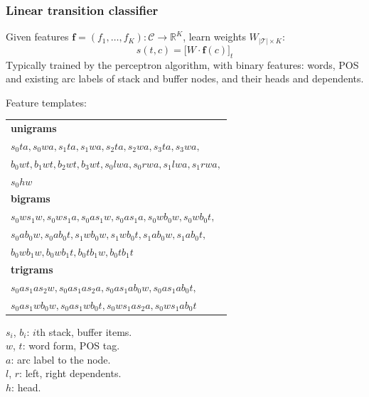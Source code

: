 \documentclass[t]{beamer}
\begin{document}
\begin{frame}
    \frametitle{Linear transition classifier \cite{Nivre03anefficient}}
    Given features $\mathbf{f}=(f_1, \ldots, f_K) : \mathcal{C}\to\mathbb{R}^K$, learn weights $W_{|\mathcal{T}|\times K}$:
    \[
    s(t,c)=\big[W\cdot\mathbf{f}(c)\big]_t
    \]
    Typically trained by the perceptron algorithm, with binary features:
	words, POS and existing arc labels of stack and buffer nodes, and
	their heads and dependents.
    
    \pause\vfill
    
    Feature templates:
    
    \begin{minipage}{.5\textwidth}
	\begin{adjustbox}{margin=3pt,frame,scale=.6}
	\begin{tabular}{l}
	\textbf{unigrams} \\
	$s_0ta, s_0wa, s_1ta, s_1wa, s_2ta, s_2wa, s_3ta, s_3wa,$ \\
	$b_0wt, b_1wt, b_2wt, b_3wt,s_0lwa, s_0rwa, s_1lwa, s_1rwa,$ \\
	$s_0hw$ \\
	\textbf{bigrams} \\
	$s_0ws_1w, s_0ws_1a, s_0as_1w, s_0as_1a, s_0wb_0w, s_0wb_0t,$ \\
	$s_0ab_0w, s_0ab_0t, s_1wb_0w, s_1wb_0t, s_1ab_0w, s_1ab_0t,$ \\
	$b_0wb_1w, b_0wb_1t, b_0tb_1w, b_0tb_1t$ \\
	\textbf{trigrams} \\
	$s_0as_1as_2w, s_0as_1as_2a, s_0as_1ab_0w, s_0as_1ab_0t,$ \\
	$s_0as_1wb_0w, s_0as_1wb_0t, s_0ws_1as_2a, s_0ws_1ab_0t$
	\end{tabular}
	\end{adjustbox}
	\end{minipage}
	\begin{minipage}{.45\textwidth}\scriptsize
	  $s_i$, $b_i$: $i$th stack, buffer items.\\
	  $w$, $t$: word form, POS tag. \\
	  $a$: arc label to the node.\\
	  $l$, $r$: left, right dependents. \\
	  $h$: head.
	\end{minipage}
\end{frame}
\end{document}
